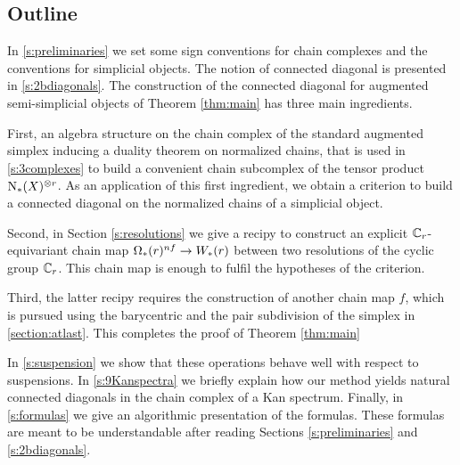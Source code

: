 \subsection{Outline}

In \cref{s:preliminaries} we set some sign conventions for chain complexes and the conventions for simplicial objects.
The notion of connected diagonal is presented in \cref{s:2bdiagonals}.
The construction of the connected diagonal for augmented semi-simplicial objects of Theorem \ref{thm:main} has three main ingredients.


First, an algebra structure on the chain complex of the standard augmented simplex inducing a duality theorem on normalized chains, that is used in \cref{s:3complexes} to build a convenient chain subcomplex of the tensor product $\operatorname{N}_{*}(X)^{\otimes r}$.
As an application of this first ingredient, we obtain a criterion to build a connected diagonal on the normalized chains of a simplicial object.


Second, in Section \ref{s:resolutions} we give a recipy to construct an explicit $\mathbb{C}_r$-equivariant chain map $\Omega_*(r)^{nf} \to W_*(r)$ between two resolutions of the cyclic group $\mathbb{C}_r$. This chain map is enough to fulfil the hypotheses of the criterion.

Third, the latter recipy requires the construction of another chain map $f$, which is pursued using the barycentric and the pair subdivision of the simplex in \cref{section:atlast}. This completes the proof of Theorem \ref{thm:main}

In \cref{s:suspension} we show that these operations behave well with respect to suspensions.
In \cref{s:9Kanspectra} we briefly explain how our method yields natural connected diagonals in the chain complex of a Kan spectrum.
Finally, in \cref{s:formulas} we give an algorithmic presentation of the formulas.
These formulas are meant to be understandable after reading Sections \ref{s:preliminaries} and \ref{s:2bdiagonals}.